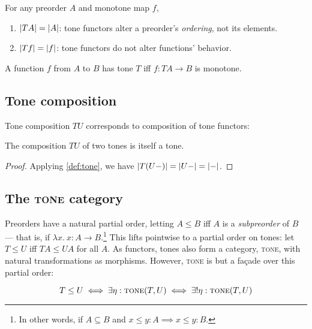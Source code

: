 \documentclass[ribbons]{rntz}
\newcommand{\fn}{\lambda}
\newcommand{\binder}{.~}
\newcommand{\bind}[1]{{#1}\binder}
\newcommand{\fnof}[1]{\fn\bind{#1}}
\newcommand{\cat}[1]{\textsc{#1}} %
\newcommand{\Tone}{\cat{tone}}
\newcommand{\Cat}{\cat{cat}}
\begin{document}
\begin{corollary}
  For any preorder $A$ and monotone map $f$,
  \begin{enumerate}
  \item $|{TA}| = |{A}|$: tone functors alter a preorder's
    \emph{ordering}, not its elements.
  \item $|{Tf}| = |{f}|$: tone functors do not alter functions'
    behavior.
  \end{enumerate}
\end{corollary}

\begin{definition}
  A function $f$ from $A$ to $B$ has tone $T$ iff $f : TA \to B$ is monotone.
\end{definition}


\subsection{Tone composition}

Tone composition $TU$ corresponds to composition of tone functors:

\begin{theorem}
  The composition $TU$ of two tones is itself a tone.
\end{theorem}

\begin{proof} Applying \cref{def:tone}, we have
  \( |{T(U-)}| = |{U-}| = |{-}| \).
\end{proof}


\subsection{The \Tone{} category}

Preorders have a natural partial order, letting $A \le B$ iff $A$ is a
\emph{subpreorder} of $B$ --- that is, if $\fnof{x} x : A \to B$.\footnote{In
  other words, if $A \subseteq B$ and $x \le y : A \implies x \le y : B$.}
%
This lifts pointwise to a partial order on tones: let $T \le U$ iff
$TA \le UA$ for all $A$.
%
As functors, tones also form a category, \Tone{}, with natural transformations
as morphisms. However, \Tone{} is but a fa\c{c}ade over this partial order:

\begin{theorem} \label{thm:tone-poset}
  \[T \le U \iff \exists \eta : \Tone(T, U) \iff \exists! \eta : \Tone(T,U)\]
\end{theorem}
\end{document}

